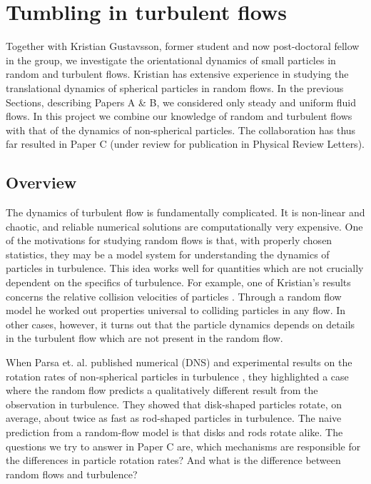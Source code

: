 \documentclass[thesis.tex]{subfiles}
\begin{document}
\chapter{Tumbling in turbulent flows}

Together with Kristian Gustavsson, former student and now post-doctoral fellow in the group, we investigate the orientational dynamics of small particles in random and turbulent flows. Kristian has extensive experience in studying the translational dynamics of spherical particles in random flows. In the previous Sections, describing Papers A \& B, we considered only steady and uniform fluid flows. In this project we combine our knowledge of random and turbulent flows with that of the dynamics of non-spherical particles. The collaboration has thus far resulted in Paper C (under review for publication in Physical Review Letters).

\section{Overview}

The dynamics of turbulent flow is fundamentally complicated. It is non-linear and chaotic, and reliable numerical solutions are computationally very expensive. One of the motivations for studying random flows is that, with properly chosen statistics, they may be a model system for understanding the dynamics of particles in turbulence. 
This idea works well for quantities which are not crucially dependent on the specifics of turbulence. For example, one of Kristian's results concerns the relative collision velocities of particles \cite{gustavsson2013relvel}. Through a random flow model he worked out properties universal to colliding particles in any flow. In other cases, however, it turns out that the particle dynamics depends on details in the turbulent flow which are not present in the random flow.

When Parsa et. al. published numerical (DNS) and experimental results on the rotation rates of non-spherical particles in turbulence \cite{parsa2012}, they highlighted a case where the random flow predicts a qualitatively different result from the observation in turbulence. They showed that disk-shaped particles rotate, on average, about twice as fast as rod-shaped particles in turbulence. The naive prediction from a random-flow model is that disks and rods rotate alike. The questions we try to answer in Paper C are, which mechanisms are responsible for the differences in particle rotation rates? And what is the difference between random flows and turbulence?
\end{document}
